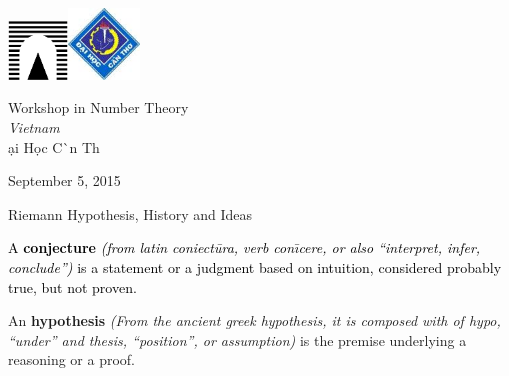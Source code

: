 \documentclass[landscape,display]{powersem} %
\begin{document}
\begin{slide}\pagestyle{empty}
\addtocounter{slide}{-1}
\includegraphics[width=1.6cm]{images/roma3.pdf}\hfill\includegraphics[width=1.9cm]{images/Can_Tho_University.jpg}
\vspace*{-2cm}

\begin{sc}\begin{center}
\small{
{Workshop in Number Theory}\\ \emph{Vietnam}\\ \DJ\d ai H\d oc C\`\acircumflex n Th\ohorn }


September 5, 2015

\vfill
\begin{Large}
\textcolor{underlcolor}{Riemann Hypothesis, History and Ideas}
\end{Large}
\end{center}
\end{sc}


\vfill
\begin{center}\hspace*{2cm}\begin{minipage}{9.5cm}
\textcolor{black}{
 A \textbf{conjecture} 
\textit{(from latin coniect\={u}ra, verb con\={\i}cere, or also 
``interpret, infer, conclude'')}
is a statement or a judgment based on intuition, considered probably true, but not proven.}\medskip

An \textbf{hypothesis} \textit{
(From the ancient greek hypothesis, it is composed with of hypo, ``under'' and thesis, ``position'',
or assumption)} is the premise underlying a reasoning or a proof.
\end{minipage}
\end{center}

\end{slide}
\end{document}
